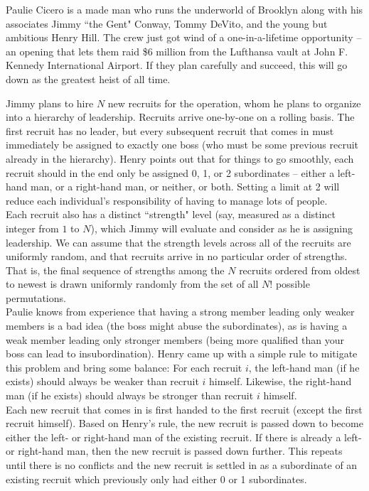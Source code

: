 
\noindent Paulie Cicero is a made man who runs the underworld of Brooklyn along with his associates Jimmy ``the Gent" Conway, Tommy DeVito, and the young but ambitious Henry Hill. The crew just got wind of a one-in-a-lifetime opportunity -- an opening that lets them raid \$6 million from the Lufthansa vault at John F. Kennedy International Airport. If they plan carefully and succeed, this will go down as the greatest heist of all time.

Jimmy plans to hire $N$ new recruits for the operation, whom he plans to organize into a hierarchy of leadership. Recruits arrive one-by-one on a rolling basis. The first recruit has no leader, but every subsequent recruit that comes in must immediately be assigned to exactly one boss (who must be some previous recruit already in the hierarchy). Henry points out that for things to go smoothly, each recruit should in the end only be assigned 0, 1, or 2 subordinates -- either a left-hand man, or a right-hand man, or neither, or both. Setting a limit at 2 will reduce each individual's responsibility of having to manage lots of people.\\

Each recruit also has a distinct ``strength" level (say, measured as a distinct integer from $1$ to $N$), which Jimmy will evaluate and consider as he is assigning leadership. We can assume that the strength levels across all of the recruits are uniformly random, and that recruits arrive in no particular order of strengths. That is, the final sequence of strengths among the $N$ recruits ordered from oldest to newest is drawn uniformly randomly from the set of all $N!$ possible permutations.\\

Paulie knows from experience that having a strong member leading only weaker members is a bad idea (the boss might abuse the subordinates), as is having a weak member leading only stronger members (being more qualified than your boss can lead to insubordination). Henry came up with a simple rule to mitigate this problem and bring some balance: For each recruit $i$, the left-hand man (if he exists) should always be weaker than recruit $i$ himself. Likewise, the right-hand man (if he exists) should always be stronger than recruit $i$ himself.\\

Each new recruit that comes in is first handed to the first recruit (except the first recruit himself). Based on Henry's rule, the new recruit is passed down to become either the left- or right-hand man of the existing recruit. If there is already a left- or right-hand man, then the new recruit is passed down further. This repeats until there is no conflicts and the new recruit is settled in as a subordinate of an existing recruit which previously only had either 0 or 1 subordinates.\\

